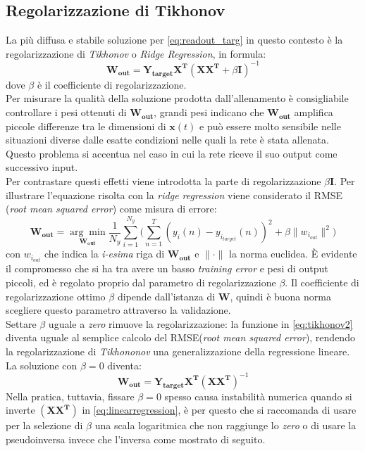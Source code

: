 \subsection{Regolarizzazione di Tikhonov}
La più diffusa e stabile soluzione per \ref{eq:readout_targ} in questo contesto è la regolarizzazione di \textit{Tikhonov} o \textit{Ridge Regression}, in formula:
\begin{equation} \label{eq:tikhonov}
\mathbf{W_{out}}= \mathbf{Y_{target}X^T} (\mathbf{XX^T} + \beta\mathbf{I})^{-1}
\end{equation}
dove $\beta$ è il coefficiente di regolarizzazione.\\
Per misurare la qualità della soluzione prodotta dall'allenamento è consigliabile controllare i pesi ottenuti di $\mathbf{W_{out}}$, grandi pesi indicano che $\mathbf{W_{out}}$ amplifica piccole differenze tra le dimensioni di $\mathbf{x}(t)$ e può essere molto sensibile nelle situazioni diverse dalle esatte condizioni nelle quali la rete è stata allenata. Questo problema si accentua nel caso in cui la rete riceve il suo output come successivo input.\\
Per contrastare questi effetti viene introdotta la parte di regolarizzazione  $\beta\mathbf{I}$. Per illustrare l'equazione risolta con la \textit{ridge regression} viene considerato il RMSE (\textit{root mean squared error}) come misura di errore:
\begin{equation} \label{eq:tikhonov2}
\mathbf{W_{out}}= \underset{\mathbf{W_{out}}}{\arg\min} \frac{1}{N_y} \sum\limits_{i=1}^{N_y} \biggl( \sum\limits_{n=1}^{T} (y_i(n)-y_{i_{target}}(n))^2 + \beta \| w_{i_{out}} \|^2 \biggr)
\end{equation}
con $w_{i_{out}}$ che indica la \textit{i-esima} riga di $\mathbf{W_{out}}$ e $\|\cdot\|$ la norma euclidea. È evidente il compromesso che si ha tra avere un basso \textit{training error} e pesi di output piccoli, ed è regolato proprio dal parametro di regolarizzazione $\beta$.
Il coefficiente di regolarizzazione ottimo $\beta$ dipende dall'istanza di $\mathbf{W}$, quindi è buona norma scegliere questo parametro attraverso la validazione.\\
Settare $\beta$ uguale a \textit{zero} rimuove la regolarizzazione: la funzione in \ref{eq:tikhonov2} diventa uguale al semplice calcolo del RMSE(\textit{root mean squared error}),
rendendo la regolarizzazione di \textit{Tikhononov} una generalizzazione della regressione lineare.\\
La soluzione con $\beta=0 $ diventa:
\begin{equation} \label{eq:linearregression}
\mathbf{W_{out}}= \mathbf{Y_{target}X^T} (\mathbf{XX^T})^{-1}
\end{equation}
Nella pratica, tuttavia, fissare $\beta=0 $ spesso causa instabilità numerica quando si inverte $(\mathbf{XX^T})$ in \ref{eq:linearregression}, è per questo che si raccomanda di usare per la selezione di $\beta$ una scala logaritmica che non raggiunge lo \textit{zero} o di usare la pseudoinversa invece che l'inversa come mostrato di seguito.

